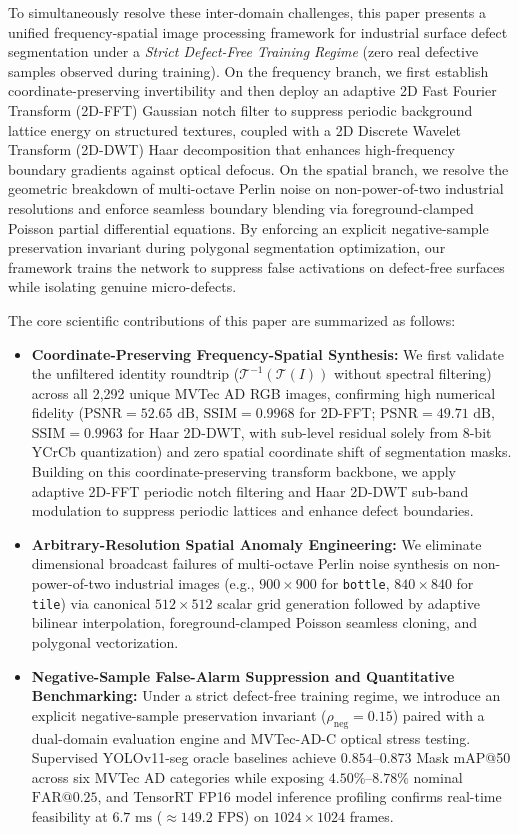 To simultaneously resolve these inter-domain challenges, this paper presents a unified frequency-spatial image processing framework for industrial surface defect segmentation under a \textit{Strict Defect-Free Training Regime} (zero real defective samples observed during training). On the frequency branch, we first establish coordinate-preserving invertibility and then deploy an adaptive 2D Fast Fourier Transform (2D-FFT) Gaussian notch filter to suppress periodic background lattice energy on structured textures, coupled with a 2D Discrete Wavelet Transform (2D-DWT) Haar decomposition that enhances high-frequency boundary gradients against optical defocus. On the spatial branch, we resolve the geometric breakdown of multi-octave Perlin noise on non-power-of-two industrial resolutions and enforce seamless boundary blending via foreground-clamped Poisson partial differential equations. By enforcing an explicit negative-sample preservation invariant during polygonal segmentation optimization, our framework trains the network to suppress false activations on defect-free surfaces while isolating genuine micro-defects.

The core scientific contributions of this paper are summarized as follows:
\begin{itemize}
    \item \textbf{Coordinate-Preserving Frequency-Spatial Synthesis:} We first validate the unfiltered identity roundtrip ($\mathcal{T}^{-1}(\mathcal{T}(I))$ without spectral filtering) across all 2,292 unique MVTec AD RGB images, confirming high numerical fidelity ($\text{PSNR} = 52.65\text{ dB}$, $\text{SSIM} = 0.9968$ for 2D-FFT; $\text{PSNR} = 49.71\text{ dB}$, $\text{SSIM} = 0.9963$ for Haar 2D-DWT, with sub-level residual solely from 8-bit YCrCb quantization) and zero spatial coordinate shift of segmentation masks. Building on this coordinate-preserving transform backbone, we apply adaptive 2D-FFT periodic notch filtering and Haar 2D-DWT sub-band modulation to suppress periodic lattices and enhance defect boundaries.
    \item \textbf{Arbitrary-Resolution Spatial Anomaly Engineering:} We eliminate dimensional broadcast failures of multi-octave Perlin noise synthesis on non-power-of-two industrial images (e.g., $900 \times 900$ for \texttt{bottle}, $840 \times 840$ for \texttt{tile}) via canonical $512 \times 512$ scalar grid generation followed by adaptive bilinear interpolation, foreground-clamped Poisson seamless cloning, and polygonal vectorization.
    \item \textbf{Negative-Sample False-Alarm Suppression and Quantitative Benchmarking:} Under a strict defect-free training regime, we introduce an explicit negative-sample preservation invariant ($\rho_{\text{neg}} = 0.15$) paired with a dual-domain evaluation engine and MVTec-AD-C optical stress testing. Supervised YOLOv11-seg oracle baselines achieve $0.854$--$0.873$ Mask mAP@50 across six MVTec AD categories while exposing $4.50\%$--$8.78\%$ nominal $\text{FAR@0.25}$, and TensorRT FP16 model inference profiling confirms real-time feasibility at $6.7\text{ ms}$ ($\approx 149.2\text{ FPS}$) on $1024 \times 1024$ frames.
\end{itemize}

